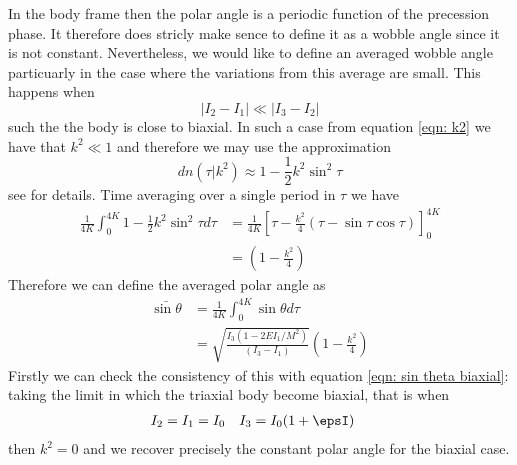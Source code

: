 \documentclass[/home/greg/Thesis/main/main.tex]{subfiles}
\begin{document}
In the body frame then the polar angle is a periodic function of the precession
phase. It therefore does stricly make sence to define it as a wobble angle
since it is not constant. Nevertheless, we would like to define an averaged 
wobble angle particuarly in the case where the variations from this average are
small. This happens when 
\begin{equation}
    |I_{2} - I_{1}| \ll |I_{3} - I_{2}|
\end{equation}
such the the body is close to biaxial. In such a case from equation \eqref{eqn: k2} 
we have that $k^{2} \ll 1$ and therefore we may use the approximation
\begin{equation}
    dn(\tau| k^{2}) \approx 1 - \frac{1}{2}k^{2} \sin^{2}\tau
\end{equation}
see \citet{Abramowitz1964} for details. Time averaging over a single period
in $\tau$ we have
\begin{align}
    \frac{1}{4K}\int_{0}^{4K} 1 - \frac{1}{2}k^{2} \sin^{2}\tau d\tau & =
    \frac{1}{4K}\left[\tau  - \frac{k^{2}}{4}\left(\tau - \sin\tau\cos\tau\right) \right]_{0}^{4K} \\
    & = \left(1 - \frac{k^{2}}{4}\right)
\end{align}
Therefore we can define the averaged polar angle as
\begin{align}
\bar{\sin\theta} & = \frac{1}{4K}\int_{0}^{4K}\sin\theta d\tau \\
                 & = \sqrt{\frac{I_{3}(1 - 2EI_{1}/M^{2})}{\left(I_{3} - I_{1}\right)}}
                     \left(1 - \frac{k^{2}}{4}\right)
\label{eqn: bar sin theta triaxial}
\end{align}
Firstly we can check the consistency of this with equation \eqref{eqn: sin theta biaxial}:
taking the limit in which the triaxial body become biaxial, that is when
\begin{align}
    I_{2}  = I_{1} = I_{0} &&& I_{3} = I_{0}(1 + \epsI)
\end{align}
then $k^{2} = 0$ and we recover precisely the constant polar angle for the biaxial
case.

\subsection{ }
\biblio
\end{document}
